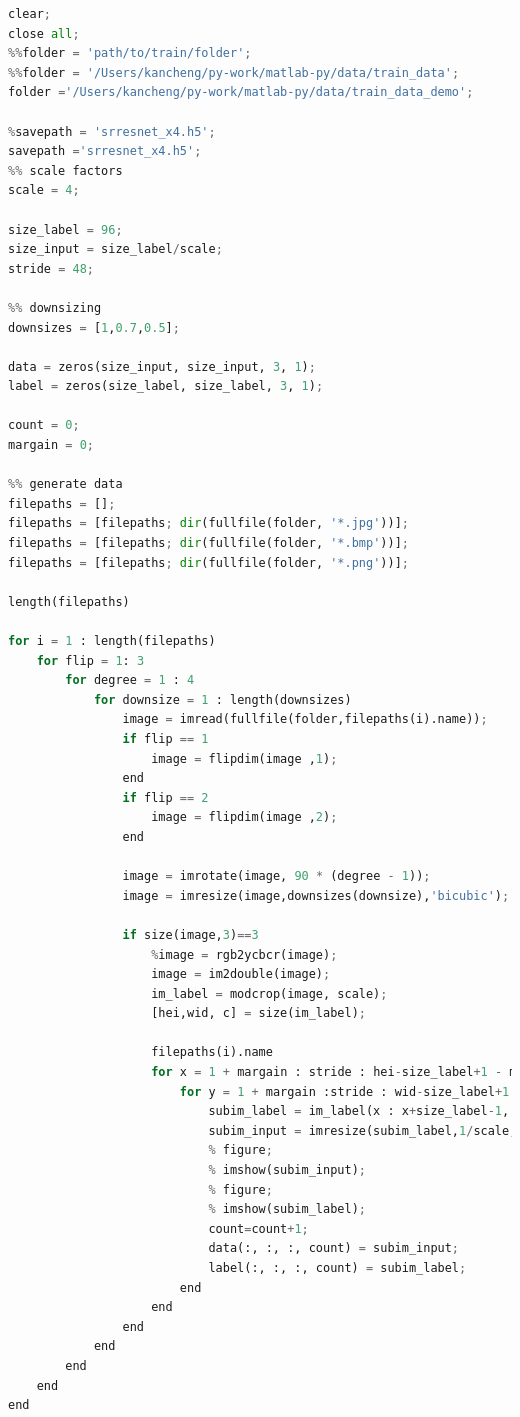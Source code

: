 \documentclass[11pt,UTF8]{ctexart}
\begin{document}
	\begin{lstlisting}[language={python}]
clear;
close all;
%%folder = 'path/to/train/folder';
%%folder = '/Users/kancheng/py-work/matlab-py/data/train_data';
folder ='/Users/kancheng/py-work/matlab-py/data/train_data_demo';

%savepath = 'srresnet_x4.h5';
savepath ='srresnet_x4.h5';
%% scale factors
scale = 4;

size_label = 96;
size_input = size_label/scale;
stride = 48;

%% downsizing
downsizes = [1,0.7,0.5];

data = zeros(size_input, size_input, 3, 1);
label = zeros(size_label, size_label, 3, 1);

count = 0;
margain = 0;

%% generate data
filepaths = [];
filepaths = [filepaths; dir(fullfile(folder, '*.jpg'))];
filepaths = [filepaths; dir(fullfile(folder, '*.bmp'))];
filepaths = [filepaths; dir(fullfile(folder, '*.png'))];

length(filepaths)

for i = 1 : length(filepaths)
    for flip = 1: 3
        for degree = 1 : 4
            for downsize = 1 : length(downsizes)
                image = imread(fullfile(folder,filepaths(i).name));
                if flip == 1
                    image = flipdim(image ,1);
                end
                if flip == 2
                    image = flipdim(image ,2);
                end
                
                image = imrotate(image, 90 * (degree - 1));
                image = imresize(image,downsizes(downsize),'bicubic');

                if size(image,3)==3
                    %image = rgb2ycbcr(image);
                    image = im2double(image);
                    im_label = modcrop(image, scale);
                    [hei,wid, c] = size(im_label);

                    filepaths(i).name
                    for x = 1 + margain : stride : hei-size_label+1 - margain
                        for y = 1 + margain :stride : wid-size_label+1 - margain
                            subim_label = im_label(x : x+size_label-1, y : y+size_label-1, :);
                            subim_input = imresize(subim_label,1/scale,'bicubic');
                            % figure;
                            % imshow(subim_input);
                            % figure;
                            % imshow(subim_label);
                            count=count+1;
                            data(:, :, :, count) = subim_input;
                            label(:, :, :, count) = subim_label;
                        end
                    end
                end
            end
        end
    end
end


\end{lstlisting}
\end{document}
